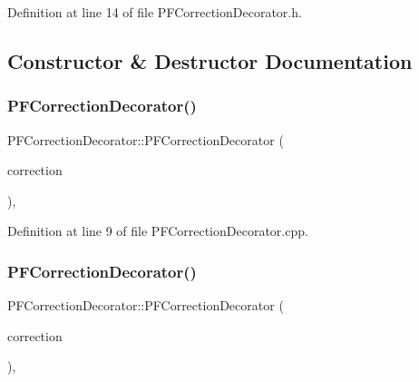 Definition at line 14 of file P\+F\+Correction\+Decorator.\+h.



\subsection{Constructor \& Destructor Documentation}
\mbox{\label{classbfl_1_1PFCorrectionDecorator_af8114c391487685cc3187ac314a5e236}} 
\subsubsection{\texorpdfstring{P\+F\+Correction\+Decorator()}{PFCorrectionDecorator()}\hspace{0.1cm}{\footnotesize\ttfamily [1/2]}}
{\footnotesize\ttfamily P\+F\+Correction\+Decorator\+::\+P\+F\+Correction\+Decorator (\begin{DoxyParamCaption}\item[{std\+::unique\+\_\+ptr$<$ \mbox{\hyperlink{classbfl_1_1PFCorrection}{P\+F\+Correction}} $>$}]{correction }\end{DoxyParamCaption})\hspace{0.3cm}{\ttfamily [protected]}, {\ttfamily [noexcept]}}



Definition at line 9 of file P\+F\+Correction\+Decorator.\+cpp.

\mbox{\label{classbfl_1_1PFCorrectionDecorator_a5cefe8664c7879daf5ce6679436d33a5}} 
\subsubsection{\texorpdfstring{P\+F\+Correction\+Decorator()}{PFCorrectionDecorator()}\hspace{0.1cm}{\footnotesize\ttfamily [2/2]}}
{\footnotesize\ttfamily P\+F\+Correction\+Decorator\+::\+P\+F\+Correction\+Decorator (\begin{DoxyParamCaption}\item[{\mbox{\hyperlink{classbfl_1_1PFCorrectionDecorator}{P\+F\+Correction\+Decorator}} \&\&}]{correction }\end{DoxyParamCaption})\hspace{0.3cm}{\ttfamily [protected]}, {\ttfamily [noexcept]}}



